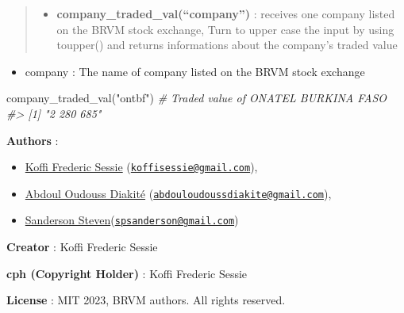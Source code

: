 \documentclass[
]{article}
\newenvironment{Shaded}{\begin{snugshade}}{\end{snugshade}}
\newcommand{\CommentTok}[1]{\textcolor[rgb]{0.56,0.35,0.01}{\textit{#1}}}
\newcommand{\FunctionTok}[1]{\textcolor[rgb]{0.00,0.00,0.00}{#1}}
\newcommand{\NormalTok}[1]{#1}
\newcommand{\StringTok}[1]{\textcolor[rgb]{0.31,0.60,0.02}{#1}}
\providecommand{\tightlist}{%
  \setlength{\itemsep}{0pt}\setlength{\parskip}{0pt}}
\begin{document}
\begin{quote}
\begin{itemize}
\tightlist
\item
  \textbf{company\_traded\_val(``company'')} : receives one company
  listed on the BRVM stock exchange, Turn to upper case the input by
  using toupper() and returns informations about the company's traded
  value
\end{itemize}
\end{quote}

\begin{itemize}
\tightlist
\item
  company : The name of company listed on the BRVM stock exchange
\end{itemize}

\begin{Shaded}
\begin{Highlighting}[]
\FunctionTok{company\_traded\_val}\NormalTok{(}\StringTok{"ontbf"}\NormalTok{) }\CommentTok{\# Traded value of ONATEL BURKINA FASO}
\CommentTok{\#\textgreater{} [1] "2 280 685"}
\end{Highlighting}
\end{Shaded}

\textbf{Authors} :

\begin{itemize}
\item
  \href{https://github.com/Koffi-Fredysessie}{Koffi Frederic Sessie}
  (\href{mailto:koffisessie@gmail.com}{\nolinkurl{koffisessie@gmail.com}}),
\item
  \href{https://github.com/AODiakite}{Abdoul Oudouss Diakité}
  (\href{mailto:abdouloudoussdiakite@gmail.com}{\nolinkurl{abdouloudoussdiakite@gmail.com}}),
\item
  \href{https://github.com/spsanderson}{Sanderson
  Steven}(\href{mailto:spsanderson@gmail.com}{\nolinkurl{spsanderson@gmail.com}})
\end{itemize}

\textbf{Creator} : Koffi Frederic Sessie

\textbf{cph (Copyright Holder)} : Koffi Frederic Sessie

\textbf{License} : MIT 2023, BRVM authors. All rights reserved.
\end{document}
